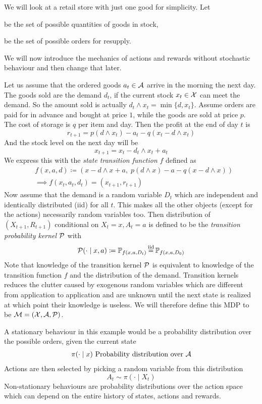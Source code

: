 \begin{example}\label{example: inventory mgmt} We will look at a retail store with just one good for simplicity. Let
	\begin{description}[noitemsep]
		\item[\(\cX\coloneqq\N\)] be the set of possible quantities of goods in stock,
		\item[\(\cA\coloneqq\N\)] be the set of possible orders for resupply.
	\end{description}
	We will now introduce the mechanics of actions and rewards without stochastic behaviour and then change that later.

	Let us assume that the ordered goods \(a_t\in\mathcal{A}\) arrive in the morning the next day. The goods sold are the demand \(d_t\), if the current stock \(x_t\in\mathcal{X}\) can meet the demand. So the amount sold is actually \(d_t\wedge x_t = \min\{d,x_t\}\). Assume orders are paid for in advance and bought at price \(1\), while the goods are sold at price \(p\). The cost of storage is \(q\) per item and day. Then the profit at the end of day \(t\) is
	\[
		r_{t+1}= p (d\wedge x_t)-a_t-q(x_t - d\wedge x_t)
	\]
	And the stock level on the next day will be
	\[
		x_{t+1}=x_t - d_t\wedge x_t + a_t 
	\]
	We express this with the \emph{state transition function} \(f\) defined as
	\begin{align*}
		&f(x,a,d)\coloneqq \left(x-d\wedge x + a,\; p(d\wedge x) - a - q(x - d\wedge x)\right)\\
		&\implies f(x_t,a_t,d_t)=(x_{t+1}, r_{t+1})
	\end{align*}
	Now assume that the demand is a random variable \(D_t\) which are independent and identically distributed (iid) for all \(t\). This makes all the other objects (except for the actions) necessarily random variables too. Then distribution of \((X_{t+1},R_{t+1})\) conditional on \(X_t=x, A_t=a\) is defined to be the \emph{transition probability kernel} \(\mathcal{P}\) with
	\begin{align*}
		\cP(\cdot \mid x, a)\coloneqq\Pr_{f(x,a,D_t)}\xeq{\text{iid}} \Pr_{f(x,a,D_0)}
	\end{align*}
	Note that knowledge of the transition kernel \(\mathcal{P}\) is equivalent to knowledge of the transition function \(f\) and the distribution of the demand. Transition kernels reduces the clutter caused by exogenous random variables which are different from application to application and are unknown until the next state is realized at which point their knowledge is useless. We will therefore define this MDP to be \(\mathcal{M}=(\mathcal{X},\mathcal{A},\mathcal{P})\).

	A stationary behaviour in this example would be a probability distribution over the possible orders, given the current state
	\begin{align*}
		\pi(\cdot \mid x) \text{ Probability distribution over }\mathcal{A}
	\end{align*}
	Actions are then selected by picking a random variable from this distribution
	\[
		A_t \sim \pi(\cdot \mid X_t)
	\]
	Non-stationary behaviours are probability distributions over the action space which can depend on the entire history of states, actions and rewards. 
\end{example}

